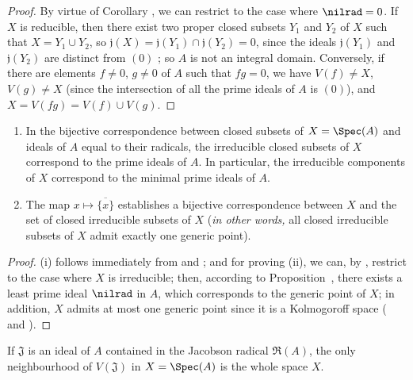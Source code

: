 \begin{proof}
By virtue of Corollary , we can restrict to the case where $\nilrad=0$.
If $X$ is reducible, then there exist two proper closed subsets $Y_1$ and $Y_2$ of $X$ such that $X=Y_1\cup Y_2$, so $\mathfrak{j}(X)=\mathfrak{j}(Y_1)\cap\mathfrak{j}(Y_2)=0$, since the ideals $\mathfrak{j}(Y_1)$ and $\mathfrak{j}(Y_2)$ are distinct from $(0)$ ;
so $A$ is not an integral domain.
Conversely, if there are elements $f\neq 0$, $g\neq 0$ of $A$ such that $fg=0$, we have $V(f)\neq X$, $V(g)\neq X$ (since the intersection of all the prime ideals of $A$ is $(0)$), and $X=V(fg)=V(f)\cup V(g)$.
\end{proof}

\begin{corollary}[1.1.14]
\label{I.1.1.14}
\medskip\noindent
\begin{enumerate}
  \item[{\rm(i)}] In the bijective correspondence between closed subsets of $X=\Spec(A)$ and ideals of $A$ equal to their radicals, the irreducible closed subsets of $X$ correspond to the prime ideals of $A$.
    In particular, the irreducible components of $X$ correspond to the minimal prime ideals of $A$.
  \item[{\rm(ii)}] The map $x\mapsto\overline{\{x\}}$ establishes a bijective correspondence between $X$ and the set of closed irreducible subsets of $X$ (\emph{in other words,} all closed irreducible subsets of $X$ admit exactly one generic point).
\end{enumerate}
\end{corollary}

\begin{proof}
(i) follows immediately from  and ;
and for proving (ii), we can, by , restrict to the case where $X$ is irreducible;
then, according to Proposition~, there exists a least prime ideal $\nilrad$ in $A$, which corresponds to the generic point
of $X$;
in addition, $X$ admits at most one generic point since it is a Kolmogoroff space ( and ).
\end{proof}

\begin{proposition}[1.1.15]
\label{I.1.1.15}
If $\mathfrak{J}$ is an ideal of $A$ contained in the Jacobson radical $\mathfrak{R}(A)$, the only
neighbourhood of $V(\mathfrak{J})$ in $X=\Spec(A)$ is the whole space $X$.
\end{proposition}

